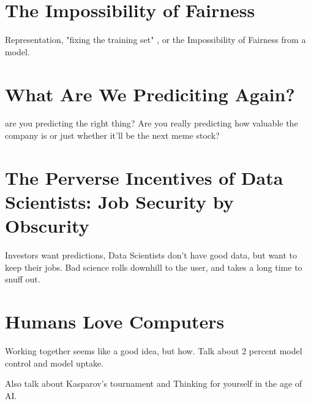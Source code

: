 \section{The Impossibility of Fairness}

Representation, "fixing the training set" , or the Impossibility of Fairness from a model.

\section{What Are We Prediciting Again?}

are you predicting the right thing? Are you really predicting how valuable the company is or just whether it'll be the next meme stock?

\section{The Perverse Incentives of Data Scientists: Job Security by Obscurity}

Investors want predictions, Data Scientists don't have good data, but want to keep their jobs. Bad science rolls downhill to the user, and takes a long time to snuff out. 

\section{Humans Love Computers}

Working together seems like a good idea, but how. Talk about 2 percent model control and model uptake. 

Also talk about Kasparov's tournament and Thinking for yourself in the age of AI. 


